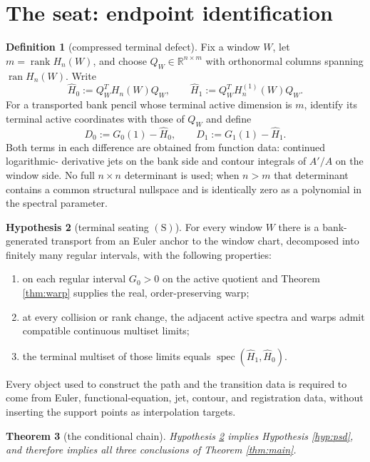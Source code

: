 \documentclass[11pt]{article}
\theoremstyle{plain}
\newtheorem{theorem}{Theorem}
\theoremstyle{definition}
\newtheorem{definition}[theorem]{Definition}
\newtheorem{hypothesis}[theorem]{Hypothesis}
\theoremstyle{remark}
\newcommand{\R}{\mathbb{R}}
\DeclareMathOperator{\spec}{spec}
\DeclareMathOperator{\rank}{rank}
\DeclareMathOperator{\ran}{ran}
\begin{document}
\section{The seat: endpoint identification}\label{sec:seat}

\begin{definition}[compressed terminal defect]\label{def:defect}
Fix a window $W$, let $m=\rank H_n(W)$, and choose
$Q_W\in\R^{n\times m}$ with orthonormal columns spanning $\ran H_n(W)$. Write
\[
 \widehat H_0:=Q_W^TH_n(W)Q_W,
 \qquad
 \widehat H_1:=Q_W^TH_n^{(1)}(W)Q_W.
\]
For a transported bank pencil whose terminal active dimension is $m$, identify its
terminal active coordinates with those of $Q_W$ and define
\[
 D_0:=G_0(1)-\widehat H_0,
 \qquad
 D_1:=G_1(1)-\widehat H_1.
\]
Both terms in each difference are obtained from function data: continued logarithmic-
derivative jets on the bank side and contour integrals of $A'/A$ on the window side.
No full $n\times n$ determinant is used; when $n>m$ that determinant contains a common
structural nullspace and is identically zero as a polynomial in the spectral parameter.
\end{definition}

\begin{hypothesis}[terminal seating $(\mathrm{S})$]\label{hyp:seat}
For every window $W$ there is a bank-generated transport from an Euler anchor to the
window chart, decomposed into finitely many regular intervals, with the following
properties:
\begin{enumerate}
\item on each regular interval $G_0>0$ on the active quotient and Theorem
\ref{thm:warp} supplies the real, order-preserving warp;
\item at every collision or rank change, the adjacent active spectra and warps admit
compatible continuous multiset limits;
\item the terminal multiset of those limits equals
$\spec(\widehat H_1,\widehat H_0)$.
\end{enumerate}
Every object used to construct the path and the transition data is required to come
from Euler, functional-equation, jet, contour, and registration data, without inserting
the support points as interpolation targets.
\end{hypothesis}

\begin{theorem}[the conditional chain]\label{thm:chain}
Hypothesis \ref{hyp:seat} implies Hypothesis \ref{hyp:psd}, and therefore implies all
three conclusions of Theorem \ref{thm:main}.
\end{theorem}
\end{document}
